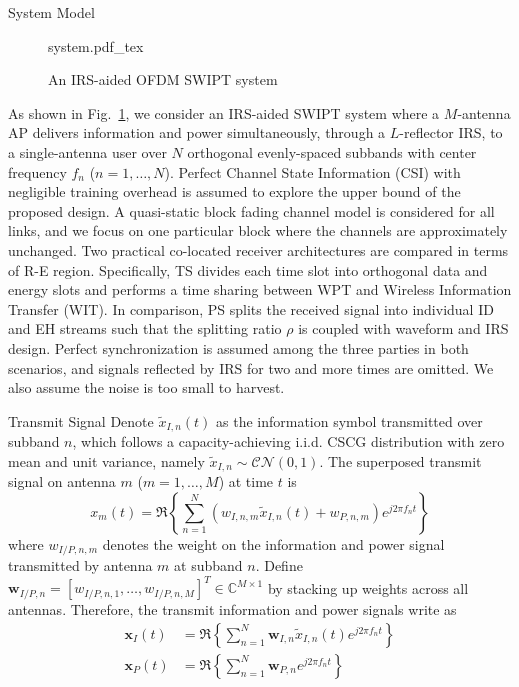 \documentclass[journal]{IEEEtran}
\begin{document}
	\begin{section}{System Model}\label{se:system_model}
		\begin{figure}[!t]
			\centering
			\def\svgwidth{\columnwidth}
			{system.pdf_tex}
			\caption{An IRS-aided OFDM SWIPT system}
			\label{fi:system}
		\end{figure}

		As shown in Fig.~\ref{fi:system}, we consider an IRS-aided SWIPT system where a $M$-antenna AP delivers information and power simultaneously, through a $L$-reflector IRS, to a single-antenna user over $N$ orthogonal evenly-spaced subbands with center frequency $f_n$ ($n=1,\dots,N$). Perfect Channel State Information (CSI) with negligible training overhead is assumed to explore the upper bound of the proposed design. A quasi-static block fading channel model is considered for all links, and we focus on one particular block where the channels are approximately unchanged. Two practical co-located receiver architectures are compared in terms of R-E region. Specifically, TS divides each time slot into orthogonal data and energy slots and performs a time sharing between WPT and Wireless Information Transfer (WIT). In comparison, PS splits the received signal into individual ID and EH streams such that the splitting ratio $\rho$ is coupled with waveform and IRS design. Perfect synchronization is assumed among the three parties in both scenarios, and signals reflected by IRS for two and more times are omitted. We also assume the noise is too small to harvest.


		\begin{subsection}{Transmit Signal}
			Denote $\tilde{x}_{I,n}(t)$ as the information symbol transmitted over subband $n$, which follows a capacity-achieving i.i.d. CSCG distribution with zero mean and unit variance, namely $\tilde{x}_{I,n}\sim\mathcal{CN}(0,1)$. The superposed transmit signal on antenna $m$ ($m=1,\dots,M$) at time $t$ is
			\begin{equation}\label{eq:x_m}
				x_m(t)=\Re\left\{\sum_{n=1}^N\left({w_{I,n,m}\tilde{x}_{I,n}(t)}+w_{P,n,m}\right){e^{j2{\pi}{f_n}{t}}}\right\}
			\end{equation}
			where $w_{I/P,n,m}$ denotes the weight on the information and power signal transmitted by antenna $m$ at subband $n$. Define $\boldsymbol{w}_{I/P,n}=[w_{I/P,n,1},\dots,w_{I/P,n,M}]^T \in \mathbb{C}^{M \times 1}$ by stacking up weights across all antennas. Therefore, the transmit information and power signals write as
			\begin{align}
				\boldsymbol{x}_{I}(t) &= \Re{\left\{\sum_{n=1}^N\boldsymbol{w}_{I,n}\tilde{x}_{I,n}(t){e^{j2{\pi}{f_n}{t}}}\right\}}\label{eq:x_I}\\
				\boldsymbol{x}_{P}(t) &= \Re{\left\{\sum_{n=1}^N\boldsymbol{w}_{P,n}{e^{j2{\pi}{f_n}{t}}}\right\}}\label{eq:x_P}
			\end{align}
		\end{subsection}



\end{section}
\end{document}
